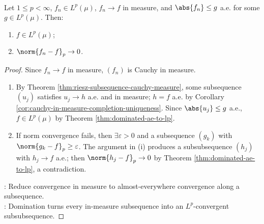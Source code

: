 \begin{theorem} \label{thm:dominated-measure-to-lp} \\
Let $1\leq p<\infty$, $f_n\in L^p(\mu)$, $f_n\to f$ in measure, and $\abs{f_n}\leq g$ a.e. for some $g\in L^p(\mu)$. Then:
\begin{enumerate}[label=(\roman*)]
\setlength{\itemsep}{0pt}
\item $f\in L^p(\mu)$;
\item $\norm{f_n-f}_p\to0$.
\end{enumerate}
\begin{proof}
Since $f_n\to f$ in measure, $(f_n)$ is Cauchy in measure.\\
\begin{enumerate}[label=(\roman*)]
\setlength{\itemsep}{0pt}
\item By Theorem \ref{thm:riesz-subsequence-cauchy-measure}, some subsequence $(u_j)$ satisfies $u_j\to h$ a.e. and in measure; $h=f$ a.e. by Corollary \ref{cor:cauchy-in-measure-completion-uniqueness}. Since $\abs{u_j}\leq g$ a.e., $f\in L^p(\mu)$ by Theorem \ref{thm:dominated-ae-to-lp}.
\item If norm convergence fails, then $\exists\varepsilon>0$ and a subsequence $(g_k)$ with $\norm{g_k-f}_p\geq\varepsilon$. The argument in (i) produces a subsubsequence $(h_j)$ with $h_j\to f$ a.e.; then $\norm{h_j-f}_p\to0$ by Theorem \ref{thm:dominated-ae-to-lp}, a contradiction.
\end{enumerate}
: Reduce convergence in measure to almost-everywhere convergence along a subsequence.\\
: Domination turns every in-measure subsequence into an $L^p$-convergent subsubsequence.
\end{proof}
\end{theorem}


